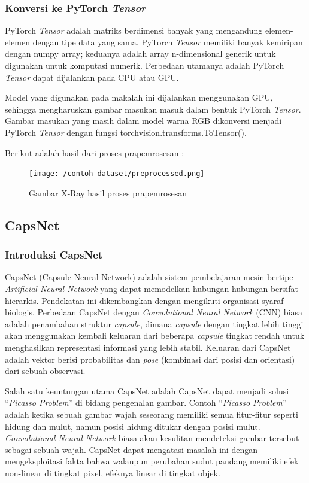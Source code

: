 \documentclass{article}
\begin{document}
    	\subsubsection{Konversi ke PyTorch \textit{Tensor}}
    	PyTorch \textit{Tensor} adalah matriks berdimensi banyak yang mengandung elemen-elemen dengan tipe data yang sama. PyTorch \textit{Tensor} memiliki banyak kemiripan dengan numpy array; keduanya adalah array n-dimensional generik untuk digunakan untuk komputasi numerik. Perbedaan utamanya adalah PyTorch \textit{Tensor} dapat dijalankan pada CPU atau GPU.
    	\par
    	Model yang digunakan pada makalah ini dijalankan menggunakan GPU, sehingga mengharuskan gambar masukan masuk dalam bentuk PyTorch \textit{Tensor}. Gambar masukan yang masih dalam model warna RGB dikonversi menjadi PyTorch \textit{Tensor} dengan fungsi torchvision.transforms.ToTensor(). 
    	
    	\par
    	Berikut adalah hasil dari proses prapemrosesan :
    	\begin{figure}[H]
    		\centering
    		\texttt{[image: /contoh dataset/preprocessed.png]}
    		\caption{Gambar X-Ray hasil proses prapemrosesan}
		\end{figure} 

    \subsection{CapsNet}
	   	\subsubsection{Introduksi CapsNet}
	   	CapsNet (Capsule Neural Network) adalah sistem pembelajaran mesin bertipe \textit{Artificial Neural Network} yang dapat memodelkan hubungan-hubungan bersifat hierarkis. Pendekatan ini dikembangkan dengan mengikuti organisasi syaraf biologis. Perbedaan CapsNet dengan \textit{Convolutional Neural Network} (CNN) biasa adalah penambahan struktur \textit{capsule}, dimana \textit{capsule} dengan tingkat lebih tinggi akan menggunakan kembali keluaran dari beberapa \textit{capsule} tingkat rendah untuk menghasilkan representasi informasi yang lebih stabil. Keluaran dari CapsNet adalah vektor berisi probabilitas dan \textit{pose} (kombinasi dari posisi dan orientasi) dari sebuah observasi. 
	   	\par
	   	Salah satu keuntungan utama CapsNet adalah CapsNet dapat menjadi solusi “\textit{Picasso Problem}” di bidang pengenalan gambar. Contoh “\textit{Picasso Problem}” adalah ketika sebuah gambar wajah seseorang memiliki semua fitur-fitur seperti hidung dan mulut, namun posisi hidung ditukar dengan posisi mulut. \textit{Convolutional Neural Network} biasa akan kesulitan mendeteksi gambar tersebut sebagai sebuah wajah. CapsNet dapat mengatasi masalah ini dengan mengeksploitasi fakta bahwa walaupun perubahan sudut pandang memiliki efek non-linear di tingkat pixel, efeknya linear di tingkat objek.
	   	
\end{document}
